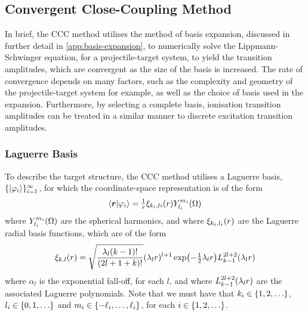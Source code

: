 \documentclass[draft]{article}
\begin{document}
\subsection{Convergent Close-Coupling Method}
\label{sec:ccc-method}

In brief, the CCC method utilises the method of basis expansion, discussed in
further detail in \autoref{app:basis-expansion}, to numerically solve the
Lippmann-Schwinger equation, for a projectile-target system, to yield the
transition amplitudes, which are convergent as the size of the basis is
increased.
The rate of convergence depends on many factors, such as the complexity and
geometry of the projectile-target system for example, as well as the choice of
basis used in the expansion.
Furthermore, by selecting a complete basis, ionisation transition amplitudes can
be treated in a similar manner to discrete excitation transition amplitudes.

\subsubsection{Laguerre Basis}
\label{sec:laguerre-basis}

To describe the target structure, the CCC method utilises a Laguerre basis,
$\lbrace\ket{\varphi_{i}}\rbrace_{i = 1}^{\infty}$, for which the coordinate-space
representation is of the form
\begin{equation}
  \label{eq:laguerre-basis}
  \bra{\boldsymbol{r}}
  \ket{\varphi_{i}}
  =
  \tfrac{1}{r}
  \xi_{k_{i}, l{i}}(r)
  Y_{l_{i}}^{m_{i}}(\Omega)
\end{equation}
where $Y_{l_{i}}^{m_{i}}(\Omega)$ are the spherical harmonics, and where
$\xi_{k_{i}, l_{i}}(r)$ are the Laguerre radial basis functions, which are of
the form
\begin{equation}
  \label{eq:laguerre-radial-basis}
  \xi_{k, l}\lr{r}
  =
  \sqrt
  {
    \dfrac
    {
      \lambda_{l}
      \lr{k - 1}!
    }
    {
      \lr{2l + 1 + k}!
    }
  }
  \lr{\lambda_{l} r}^{l + 1}
  \exponential\lr[\big]{- \tfrac{1}{2} \lambda_{l} r}
  L_{k - 1}^{2l + 2}\lr{\lambda_{l} r}
\end{equation}
where $\alpha_{l}$ is the exponential fall-off, for each $l$, and where
$L_{k - 1}^{2l + 2}(\lambda_{l} r)$ are the associated Laguerre polynomials.
Note that we must have that
$k_{i} \in \lrset{1, 2, \dotsc}$,
$l_{i} \in \lrset{0, 1, \dotsc}$ and
$m_{i} \in \lbrace-\ell_{i}, \dotsc, \ell_{i}\rbrace$, for each
$i \in \lrset{1, 2, \dotsc}$.
\end{document}
